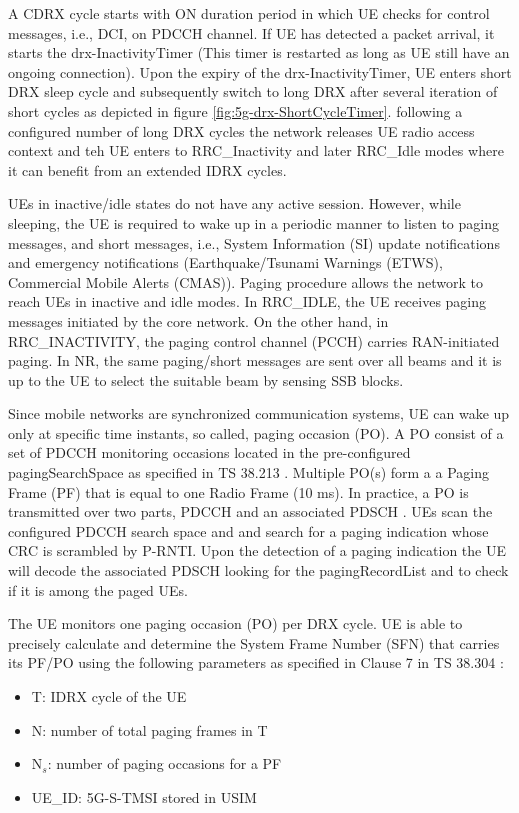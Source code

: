 \documentclass[conference]{IEEEtran}
\begin{document}
\begin{itemize}
\end{itemize}

A CDRX cycle starts with ON duration period in which UE checks for control messages, i.e., DCI, on PDCCH channel. If UE has detected a packet arrival, it starts the drx-InactivityTimer (This timer is restarted as long as UE still have an ongoing connection). Upon the expiry of the drx-InactivityTimer, UE enters short DRX sleep cycle and subsequently switch to long DRX after several iteration of short cycles as depicted in figure \ref{fig:5g-drx-ShortCycleTimer}. following a configured number of long DRX cycles the network releases UE radio access context and teh UE enters to RRC\_Inactivity and later RRC\_Idle modes where it can benefit from an extended IDRX cycles.



UEs in inactive/idle states do not have any active session. However, while sleeping, the UE is required to wake up in a periodic manner to listen to paging messages, and short messages, i.e., System Information (SI) update notifications and emergency notifications (Earthquake/Tsunami Warnings (ETWS), Commercial Mobile Alerts (CMAS)). Paging procedure allows the network to reach UEs in inactive and idle modes. In RRC\_IDLE, the UE receives paging messages initiated by the core network. On the other hand, in RRC\_INACTIVITY, the paging control channel (PCCH) carries RAN-initiated paging. In NR, the same paging/short messages are sent over all beams and it is up to the UE to select the suitable beam by sensing SSB blocks.



Since mobile networks are synchronized communication systems, UE can wake up only at specific time instants, so called, paging occasion (PO). A PO consist of a set of PDCCH monitoring occasions located in the pre-configured pagingSearchSpace as specified in TS 38.213 \cite{3gpp_nr_2022-1_38.213}. Multiple PO(s) form a a Paging Frame (PF) that is equal to one Radio Frame (10 ms). In practice, a PO is transmitted over two parts, PDCCH and an associated PDSCH \cite{esswie_power_2022}. UEs scan the configured PDCCH search space and and search for a paging indication whose CRC is scrambled by P-RNTI. Upon the detection of a paging indication the UE will decode the associated PDSCH looking for the pagingRecordList and to check if it is among the paged UEs.

The UE monitors one paging occasion (PO) per DRX cycle. UE is able to precisely calculate and determine the System Frame Number (SFN) that carries its PF/PO using the following parameters as specified in Clause 7 in TS 38.304 \cite{3gpp.38.304}:
 \begin{itemize}
     \item T: IDRX cycle of the UE
     \item N: number of total paging frames in T
     \item N$_{s}$: number of paging occasions for a PF
     \item UE\_ID: 5G-S-TMSI stored in USIM
 \end{itemize}
\end{document}
